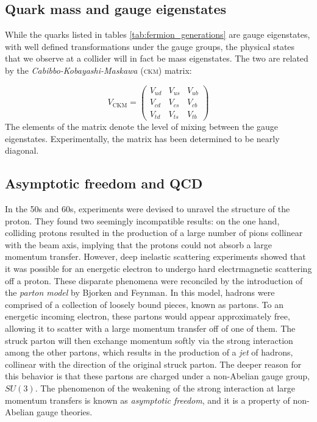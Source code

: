 \subsection{Quark mass and gauge eigenstates}
While the quarks listed in tables \ref{tab:fermion_generations} are gauge eigenstates, with well defined transformations under the gauge groups, the physical states that we observe at a collider will in fact be mass eigenstates. The two are related by the \emph{Cabibbo-Kobayashi-Maskawa} (\textsc{ckm}) matrix:

\begin{equation}
  V_\text{CKM} =
  \begin{pmatrix}
    V_{ud} & V_{us} & V_{ub}\\
    V_{cd} & V_{cs} & V_{cb}\\
    V_{td} & V_{ts} & V_{tb}
  \end{pmatrix}
\end{equation}
The elements of the matrix denote the level of mixing between the gauge eigenstates. Experimentally, the matrix has been determined to be nearly diagonal.

\subsection{Asymptotic freedom and QCD}
In the 50s and 60s, experiments were devised to unravel the structure of the proton. They found two seemingly incompatible results: on the one hand, colliding protons resulted in the production of a large number of pions collinear with the beam axis, implying that the protons could not absorb a large momentum transfer. However, deep inelastic scattering experiments showed that it was possible for an energetic electron to undergo hard electrmagnetic scattering off a proton. These disparate phenomena were reconciled by the introduction of the \emph{parton model} by Bjorken and Feynman. In this model, hadrons were comprised of a collection of loosely bound pieces, known as partons. To an energetic incoming electron, these partons would appear approximately free, allowing it to scatter with a large momentum transfer off of one of them. The struck parton will then exchange momentum softly via the strong interaction among the other partons, which results in the production of a \emph{jet} of hadrons, collinear with the direction of the original struck parton. The deeper reason for this behavior is that these partons are charged under a non-Abelian gauge group, $SU(3)$. The phenomenon of the weakening of the strong interaction at large momentum transfers is known as \emph{asymptotic freedom}, and it is a property of non-Abelian gauge theories.

